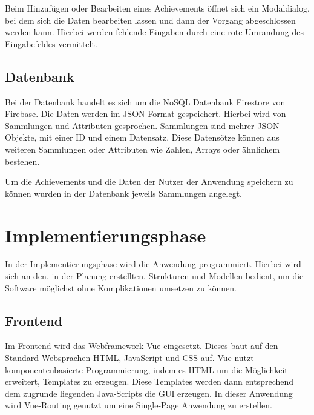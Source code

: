 \documentclass[12pt]{article}
\begin{document}
Beim Hinzufügen oder Bearbeiten eines Achievements öffnet sich ein
Modaldialog, bei dem sich die Daten bearbeiten lassen und dann der
Vorgang abgeschlossen werden kann. Hierbei werden fehlende Eingaben durch
eine rote Umrandung des Eingabefeldes vermittelt.


\subsection{Datenbank}

Bei der Datenbank handelt es sich um die NoSQL Datenbank Firestore
von Firebase. Die Daten werden im JSON-Format gespeichert. Hierbei wird
von Sammlungen und Attributen gesprochen. Sammlungen sind mehrer JSON-Objekte, mit einer
ID und einem Datensatz. Diese Datensötze können aus weiteren Sammlungen
oder Attributen wie Zahlen, Arrays oder ähnlichem bestehen.

Um die Achievements und die Daten der Nutzer der Anwendung speichern zu können
wurden in der Datenbank jeweils Sammlungen angelegt.


%
%

\section{Implementierungsphase}
In der Implementierungsphase wird die Anwendung programmiert. Hierbei wird sich an den,
in der Planung erstellten, Strukturen und Modellen bedient, um die Software möglichst ohne
Komplikationen umsetzen zu können.

\subsection{Frontend}


Im Frontend wird das Webframework Vue eingesetzt. Dieses baut auf den
Standard Websprachen HTML, JavaScript und CSS auf. 
Vue nutzt komponentenbasierte Programmierung, indem es HTML um die Möglichkeit
erweitert, Templates zu erzeugen. Diese Templates werden dann entsprechend dem zugrunde 
liegenden Java-Scripts die GUI erzeugen. %
In dieser Anwendung wird Vue-Routing genutzt um eine Single-Page Anwendung zu
erstellen. 
\end{document}

